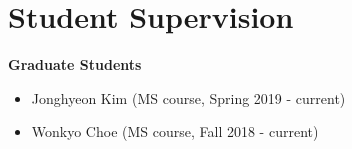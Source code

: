 \section*{Student Supervision}
\begin{description}
    \item \textbf{Graduate Students}
        \begin{itemize}
            \item Jonghyeon Kim (MS course, Spring 2019 - current)
            \item Wonkyo Choe (MS course, Fall 2018 - current)
        \end{itemize}
\end{description}
